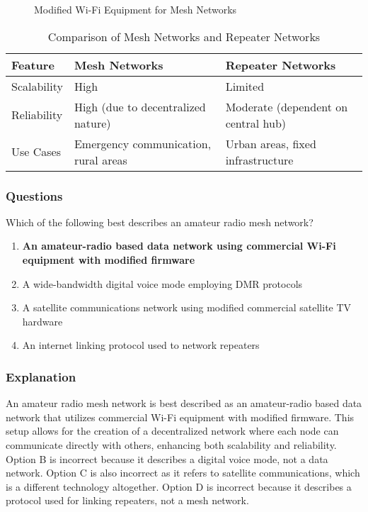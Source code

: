 \begin{figure}[h]
    \centering
    \caption{Modified Wi-Fi Equipment for Mesh Networks}
    \label{fig:mesh-wifi}
\end{figure}

\begin{table}[h]
    \centering
    \begin{tabular}{|l|l|l|}
        \hline
        \textbf{Feature} & \textbf{Mesh Networks} & \textbf{Repeater Networks} \\
        \hline
        Scalability & High & Limited \\
        Reliability & High (due to decentralized nature) & Moderate (dependent on central hub) \\
        Use Cases & Emergency communication, rural areas & Urban areas, fixed infrastructure \\
        \hline
    \end{tabular}
    \caption{Comparison of Mesh Networks and Repeater Networks}
    \label{tab:mesh-repeater-comparison}
\end{table}

\subsubsection{Questions}

\begin{tcolorbox}[colback=gray!10!white,colframe=black!75!black,title={T8D12}]
    Which of the following best describes an amateur radio mesh network?
    \begin{enumerate}[label=\Alph*),noitemsep]
        \item \textbf{An amateur-radio based data network using commercial Wi-Fi equipment with modified firmware}
        \item A wide-bandwidth digital voice mode employing DMR protocols
        \item A satellite communications network using modified commercial satellite TV hardware
        \item An internet linking protocol used to network repeaters
    \end{enumerate}
\end{tcolorbox}

\subsubsection*{Explanation}

An amateur radio mesh network is best described as an amateur-radio based data network that utilizes commercial Wi-Fi equipment with modified firmware. This setup allows for the creation of a decentralized network where each node can communicate directly with others, enhancing both scalability and reliability. Option B is incorrect because it describes a digital voice mode, not a data network. Option C is also incorrect as it refers to satellite communications, which is a different technology altogether. Option D is incorrect because it describes a protocol used for linking repeaters, not a mesh network.
